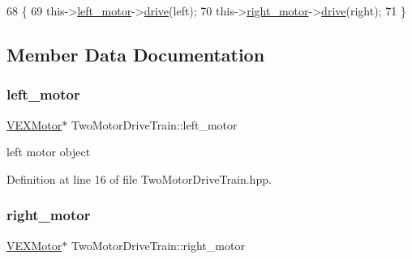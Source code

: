\begin{DoxyCode}
68                                                       \{
69     this->\hyperlink{class_two_motor_drive_train_a134c95e1f45a5156924208cddaa3661f}{left\_motor}->\hyperlink{class_v_e_x_motor_ac8ab5c30e4be4a9e3ed290e7827bcf1a}{drive}(left);
70     this->\hyperlink{class_two_motor_drive_train_a0bdefa7c731c2407ad4a4dad0902bbd3}{right\_motor}->\hyperlink{class_v_e_x_motor_ac8ab5c30e4be4a9e3ed290e7827bcf1a}{drive}(right);
71 \}
\end{DoxyCode}


\subsection{Member Data Documentation}
\mbox{\label{class_two_motor_drive_train_a134c95e1f45a5156924208cddaa3661f}} 
\subsubsection{\texorpdfstring{left\+\_\+motor}{left\_motor}}
{\footnotesize\ttfamily \hyperlink{class_v_e_x_motor}{V\+E\+X\+Motor}$\ast$ Two\+Motor\+Drive\+Train\+::left\+\_\+motor\hspace{0.3cm}{\ttfamily [private]}}



left motor object 



Definition at line 16 of file Two\+Motor\+Drive\+Train.\+hpp.

\mbox{\label{class_two_motor_drive_train_a0bdefa7c731c2407ad4a4dad0902bbd3}} 
\subsubsection{\texorpdfstring{right\+\_\+motor}{right\_motor}}
{\footnotesize\ttfamily \hyperlink{class_v_e_x_motor}{V\+E\+X\+Motor}$\ast$ Two\+Motor\+Drive\+Train\+::right\+\_\+motor\hspace{0.3cm}{\ttfamily [private]}}



